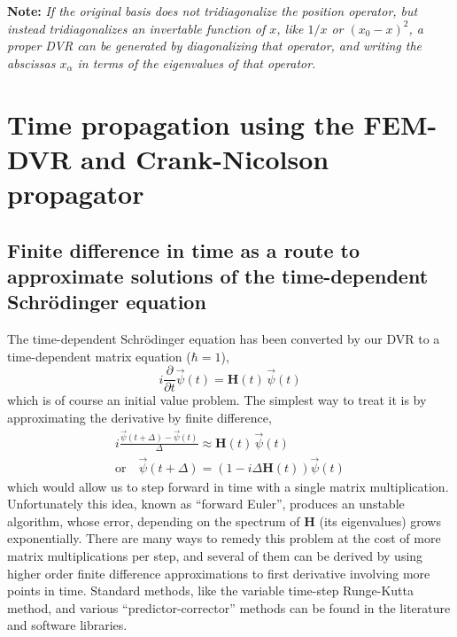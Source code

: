 \documentclass[aps,amssymb,superscriptaddress,floatfix]{revtex4}
\begin{document}
\textbf{Note: } \textit{ If the original basis does not tridiagonalize the position operator, but instead tridiagonalizes an invertable function of $x$, like $1/x$ or $(x_0-x)^2$, a proper DVR can be generated by diagonalizing that operator, and writing the abscissas $x_\alpha$ in terms of the eigenvalues of that operator. }

\section{Time propagation using the FEM-DVR and Crank-Nicolson propagator}

\subsection{Finite difference in time as a route to approximate solutions of the time-dependent Schr\"odinger equation}
The time-dependent Schr\"odinger equation has been converted by our DVR to a time-dependent matrix equation ($\hbar = 1$),
\begin{equation}
i\frac{\partial}{\partial t} \vec{\psi}(t) = \mathbf{H}(t) \, \vec{\psi}(t)
\end{equation}
which is of course an initial value problem.  The simplest way to treat it is by approximating the derivative by finite difference,
\begin{equation}
\begin{split}
i \frac{\vec{\psi}(t+\Delta) - \vec{\psi}(t)}{\Delta} \approx  \mathbf{H}(t)\, \vec{\psi}(t) \\
\textrm{or}\quad \vec{\psi}(t+\Delta) = \left(1-i\Delta \mathbf{H}(t)\right) \vec{\psi}(t)
\end{split}
\end{equation}
which would allow us to step forward in time with a single matrix multiplication.  Unfortunately this idea, known as ``forward Euler'', produces an unstable algorithm, whose error, depending on the spectrum of $\mathbf{H}$ (its eigenvalues) grows exponentially.  There are many ways to remedy this problem at the cost of more matrix multiplications per step, and several of them can be derived by using higher order finite difference approximations to first derivative involving more points in time.  Standard methods, like the variable time-step Runge-Kutta method, and various ``predictor-corrector'' methods can be found in the literature and software libraries. 
\end{document}
